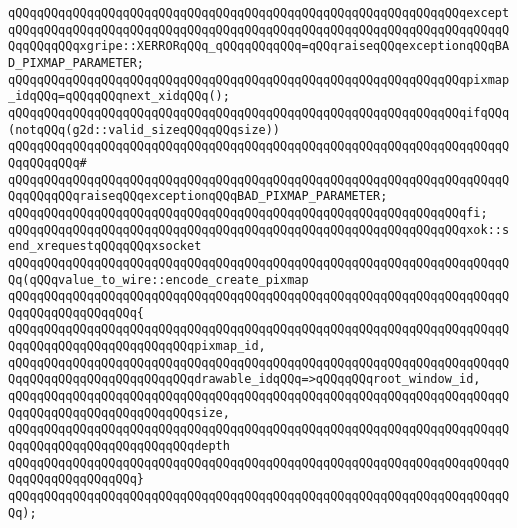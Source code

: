 \verb|qQQqqQQqqQQqqQQqqQQqqQQqqQQqqQQqqQQqqQQqqQQqqQQqqQQqqQQqqQQqqQQqexcept|\newline
\verb|qQQqqQQqqQQqqQQqqQQqqQQqqQQqqQQqqQQqqQQqqQQqqQQqqQQqqQQqqQQqqQQqqQQqqQQqqQQqqQQqxgripe::XERRORqQQq_qQQqqQQqqQQq=qQQqraiseqQQqexceptionqQQqBAD_PIXMAP_PARAMETER;|\newline
\newline
\verb|qQQqqQQqqQQqqQQqqQQqqQQqqQQqqQQqqQQqqQQqqQQqqQQqqQQqqQQqqQQqqQQqpixmap_idqQQq=qQQqqQQqnext_xidqQQq();|\newline
\newline
\verb|qQQqqQQqqQQqqQQqqQQqqQQqqQQqqQQqqQQqqQQqqQQqqQQqqQQqqQQqqQQqqQQqifqQQq(notqQQq(g2d::valid_sizeqQQqqQQqsize))|\newline
\verb|qQQqqQQqqQQqqQQqqQQqqQQqqQQqqQQqqQQqqQQqqQQqqQQqqQQqqQQqqQQqqQQqqQQqqQQqqQQqqQQq#|\newline
\verb|qQQqqQQqqQQqqQQqqQQqqQQqqQQqqQQqqQQqqQQqqQQqqQQqqQQqqQQqqQQqqQQqqQQqqQQqqQQqqQQqraiseqQQqexceptionqQQqBAD_PIXMAP_PARAMETER;|\newline
\verb|qQQqqQQqqQQqqQQqqQQqqQQqqQQqqQQqqQQqqQQqqQQqqQQqqQQqqQQqqQQqqQQqfi;|\newline
\newline
\verb|qQQqqQQqqQQqqQQqqQQqqQQqqQQqqQQqqQQqqQQqqQQqqQQqqQQqqQQqqQQqqQQqxok::send_xrequestqQQqqQQqxsocket|\newline
\verb|qQQqqQQqqQQqqQQqqQQqqQQqqQQqqQQqqQQqqQQqqQQqqQQqqQQqqQQqqQQqqQQqqQQqqQQq(qQQqvalue_to_wire::encode_create_pixmap|\newline
\verb|qQQqqQQqqQQqqQQqqQQqqQQqqQQqqQQqqQQqqQQqqQQqqQQqqQQqqQQqqQQqqQQqqQQqqQQqqQQqqQQqqQQqqQQq{|\newline
\verb|qQQqqQQqqQQqqQQqqQQqqQQqqQQqqQQqqQQqqQQqqQQqqQQqqQQqqQQqqQQqqQQqqQQqqQQqqQQqqQQqqQQqqQQqqQQqqQQqpixmap_id,|\newline
\verb|qQQqqQQqqQQqqQQqqQQqqQQqqQQqqQQqqQQqqQQqqQQqqQQqqQQqqQQqqQQqqQQqqQQqqQQqqQQqqQQqqQQqqQQqqQQqqQQqdrawable_idqQQq=>qQQqqQQqroot_window_id,|\newline
\verb|qQQqqQQqqQQqqQQqqQQqqQQqqQQqqQQqqQQqqQQqqQQqqQQqqQQqqQQqqQQqqQQqqQQqqQQqqQQqqQQqqQQqqQQqqQQqqQQqsize,|\newline
\verb|qQQqqQQqqQQqqQQqqQQqqQQqqQQqqQQqqQQqqQQqqQQqqQQqqQQqqQQqqQQqqQQqqQQqqQQqqQQqqQQqqQQqqQQqqQQqqQQqdepth|\newline
\verb|qQQqqQQqqQQqqQQqqQQqqQQqqQQqqQQqqQQqqQQqqQQqqQQqqQQqqQQqqQQqqQQqqQQqqQQqqQQqqQQqqQQqqQQq}|\newline
\verb|qQQqqQQqqQQqqQQqqQQqqQQqqQQqqQQqqQQqqQQqqQQqqQQqqQQqqQQqqQQqqQQqqQQqqQQq);|\newline
